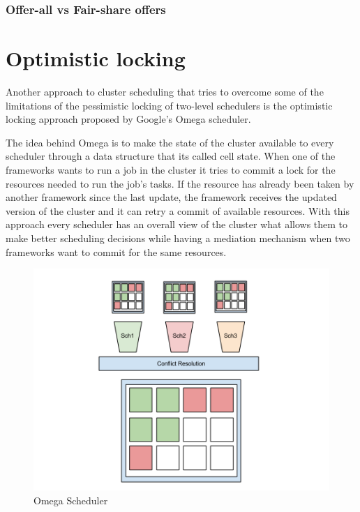 \documentclass{svjour3}                     %
\begin{document}
\subsubsection{Offer-all vs Fair-share offers}

\section{Optimistic locking}

Another approach to cluster scheduling that tries to overcome some of
the limitations of the pessimistic locking of two-level schedulers is
the optimistic locking approach proposed by Google's Omega
scheduler.

The idea behind Omega is to make the state of the cluster available to
every scheduler through a data structure that its called cell
state. When one of the frameworks wants to run a job in the cluster it
tries to commit a lock for the resources needed to run the job's
tasks. If the resource has already been taken by another framework
since the last update, the framework receives the updated version of
the cluster and it can retry a commit of available resources. With
this approach every scheduler has an overall view of the cluster what
allows them to make better scheduling decisions while having a
mediation mechanism when two frameworks want to commit for the same 
resources.

\begin{figure}[!ht]
  \centering
  \includegraphics[scale=0.25,natwidth=960,natheight=720]{Omega.png}
  \caption{Omega Scheduler}
  \label{fig:two_level}
\end{figure}
\end{document}

